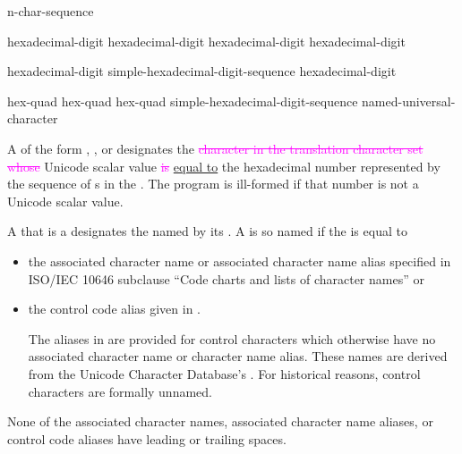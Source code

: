 \documentclass{wg21}
\newcommand{\addedTranslation}[1]{\textcolor{addclrTwo}{\uline{#1}}}
\newcommand{\removedTranslation}[1]{\textcolor{magenta}{\sout{#1}}}
\newcommand{\changedTranslation}[2]{\removedTranslation{#1} \addedTranslation{#2}}
\newcommand{\changeducs}[1]{\textcolor{noteclr}{#1}}
\begin{document}
\begin{bnf}
    \br
     n-char-sequence \terminal{\}}
\end{bnf}

\begin{bnf}
    \br
    hexadecimal-digit hexadecimal-digit hexadecimal-digit hexadecimal-digit
\end{bnf}

\begin{bnf}
    \br
    hexadecimal-digit\br
    simple-hexadecimal-digit-sequence hexadecimal-digit
\end{bnf}

\begin{bnf}
    \br
     hex-quad\br
     hex-quad hex-quad\br
     simple-hexadecimal-digit-sequence \terminal{\}}\br
    named-universal-character
\end{bnf}

\pnum
A 
of the form  ,
  , or
designates the \removedTranslation{character in the translation character set
whose} \changeducs{Unicode} scalar value \changedTranslation{is}{equal to} the hexadecimal number represented by
the sequence of s
in the .
The program is ill-formed if that number is not a \changeducs{Unicode} scalar value.

\pnum
A 
that is a 
designates the  named by its .
A  is so named if the  is equal to
\begin{itemize}
    \item
    the associated character name or associated character name alias
    specified in ISO/IEC 10646 subclause ``Code charts and lists of character names''
    or
    \item
    the control code alias given in .
    \begin{note}
        The aliases in  are provided for control characters
        which otherwise have no associated character name or character name alias.
        These names are derived from
        the Unicode Character Database's .
        For historical reasons, control characters are formally unnamed.
    \end{note}
\end{itemize}
\begin{note}
    None of the associated character names,
    associated character name aliases, or
    control code aliases
    have leading or trailing spaces.
\end{note}
\end{document}

